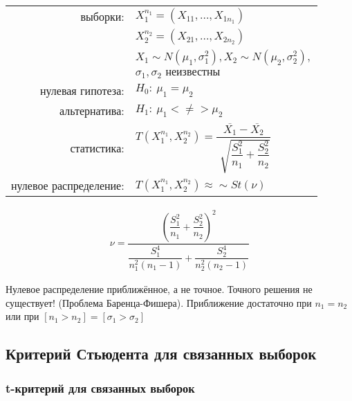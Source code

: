 \documentclass[a4paper,12pt]{article}
\begin{document}
\begin{table}[h]
	\begin{tabular}{rl}
выборки:& $X^{n_{1}}_{1} = \left( X_{11}, \ldots, X_{1n_{1}} \right)$ \\
       & $X^{n_{2}}_{2} = \left( X_{21}, \ldots, X_{2n_{2}} \right)$ \\
       & $X_{1} \sim N( \mu_{1}, \sigma^{2}_{1}), X_{2} \sim N( \mu_{2}, \sigma^{2}_{2}), $ \\
       & $\sigma_{1},\sigma_{2} \text{ неизвестны} $ \\
нулевая гипотеза: & $H_{0}:~\mu_{1}=\mu_{2}$ \\
альтернатива: & $H_{1}:~\mu_{1} <\neq> \mu_{2}$ \\
статистика: & $ T\left( X^{n_{1}}_{1}, X^{n_{2}}_{2} \right) = \dfrac{\overline{X_{1}}-\overline{X_{2}}}{\sqrt[]{ \dfrac{S_{1}^{2}}{n_{1}} + \dfrac{S_{2}^{2}}{n_{2}} }}$ \\
нулевое распределение: & $ T\left( X^{n_{1}}_{1}, X^{n_{2}}_{2} \right) \approx \sim St(\nu) $
	\end{tabular}
\end{table}

\begin{align*}
\nu = \dfrac{\left( \dfrac{S_{1}^{2}}{n_{1}} + \dfrac{S_{2}^{2}}{n_{2}} \right)^2 }{\dfrac{S_{1}^{4}}{n_{1}^{2}(n_{1}-1)} + \dfrac{S_{2}^{4}}{n_{2}^{2}(n_{2}-1)}}
\end{align*}

Нулевое распределение приближённое, а не точное. Точного решения не существует! (Проблема Баренца-Фишера). Приближение достаточно при $n_{1} = n_{2}$ или при $[n_{1} > n_{2}] = [\sigma_{1} > \sigma_{2}]$

\pagebreak

\subsection{Критерий Стьюдента для связанных выборок}

\subsubsection{t-критерий для связанных выборок}
\end{document}
